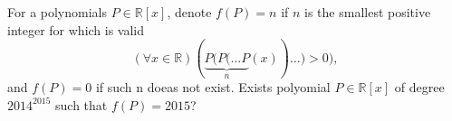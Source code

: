For a polynomials $ P\in \mathbb{R}[x]$,  denote $f(P)=n$ if $n$ is the smallest positive integer for which is valid$$(\forall x\in \mathbb{R})(\underbrace{P(P(\ldots P}_{n}(x))\ldots )>0),$$and $f(P)=0$ if such n doeas not exist. Exists polyomial $P\in \mathbb{R}[x]$ of degree $2014^{2015}$ such that  $f(P)=2015$?
